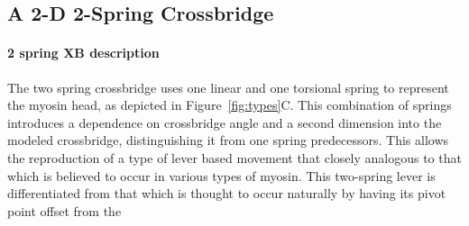 \documentclass[]{article}
\begin{document}
% 
%  
% 
%  


\subsection{A 2-D 2-Spring Crossbridge} %
\label{sub:a_2_d_2_spring_crossbridge}

\paragraph*{2 spring XB description} %
\label{par:2_spring_xb_description}
The two spring crossbridge uses one linear and one torsional spring to represent the myosin head, as depicted in Figure~\ref{fig:types}C.
This combination of springs introduces a dependence on crossbridge angle and a second dimension into the modeled crossbridge, distinguishing it from one spring predecessors.
This allows the reproduction of a type of lever based movement that closely analogous to that which is believed to occur in various types of myosin. \citet{Someone20xx, SomeoneElse19xx} 
This two-spring lever is differentiated from that which is thought to occur naturally by having its pivot point offset from the 
\end{document}
